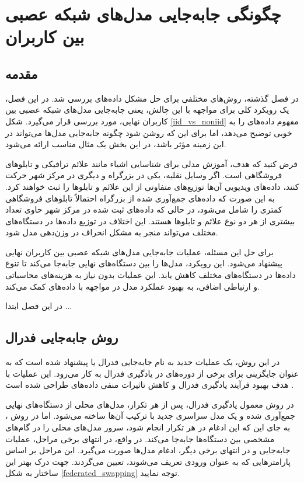 \chapter{چگونگی جابه‌جایی مدل‌های شبکه عصبی بین کاربران}

\section{مقدمه}
در فصل گذشته، روش‌های مختلفی برای حل مشکل داده‌های
بررسی شد. در این فصل، یک رویکرد کلی برای مواجهه با این چالش، یعنی جابه‌جایی مدل‌های شبکه عصبی بین کاربران نهایی، مورد بررسی قرار می‌گیرد.
شکل
\ref{iid_vs_noniid}
مفهوم داده‌های
را به خوبی توضیح می‌دهد، اما برای این که روشن شود چگونه جابه‌جایی مدل‌ها می‌تواند در این زمینه مؤثر باشد، در این بخش یک مثال مناسب ارائه می‌شود.

فرض کنید که هدف، آموزش مدلی برای شناسایی اشیاء مانند علائم ترافیکی و تابلوهای فروشگاهی است. اگر وسایل نقلیه، یکی در بزرگراه و دیگری در مرکز شهر حرکت کنند، داده‌های ویدیویی آن‌ها توزیع‌های متفاوتی از این علائم و تابلوها را ثبت خواهند کرد. به این صورت که داده‌های جمع‌آوری شده از بزرگراه احتمالاً تابلوهای فروشگاهی کمتری را شامل می‌شود، در حالی که داده‌های ثبت شده در مرکز شهر حاوی تعداد بیشتری از هر دو نوع علائم و تابلوها هستند. این اختلاف در توزیع داده‌ها در دستگاه‌های مختلف می‌تواند منجر به مشکل انحراف در وزن‌دهی مدل شود.

برای حل این مسئله، عملیات جابه‌جایی مدل‌های شبکه عصبی بین کاربران نهایی پیشنهاد می‌شود. این رویکرد، مدل‌ها را بین دستگاه‌های نهایی جابه‌جا می‌کند تا تنوع داده‌ها در دستگاه‌های مختلف کاهش یابد. این عملیات بدون نیاز به هزینه‌های محاسباتی و ارتباطی اضافی، به بهبود عملکرد مدل در مواجهه با داده‌های
کمک می‌کند.

در این فصل ابتدا ...

\section{
	روش جابه‌جایی فدرال%
}
در این روش، یک عملیات جدید به نام جابه‌جایی فدرال یا
پیشنهاد شده است که به عنوان جایگزینی برای برخی از دوره‌های
در یادگیری فدرال به کار می‌رود.
این عملیات با هدف بهبود فرآیند یادگیری فدرال و کاهش تاثیرات منفی داده‌های
طراحی شده است
\cite{chiu2020semisupervised}.


در روش‌ معمول یادگیری فدرال، پس از هر تکرار، مدل‌های محلی از دستگاه‌های نهایی جمع‌آوری شده و یک مدل سراسری جدید با ترکیب آن‌ها ساخته می‌شود. اما در روش
%
، به جای این که این ادغام در هر تکرار انجام شود، سرور مدل‌های محلی را در گام‌های مشخصی بین دستگاه‌ها جابه‌جا می‌کند. در واقع، در انتهای برخی مراحل، عملیات جابه‌جایی و در انتهای برخی دیگر، ادغام مدل‌ها صورت می‌گیرد. این مراحل بر اساس پارامترهایی که به عنوان ورودی تعریف می‌شوند، تعیین می‌گردند.
جهت درک بهتر این ساختار به شکل
\ref{federated_swapping}
توجه نمایید.


